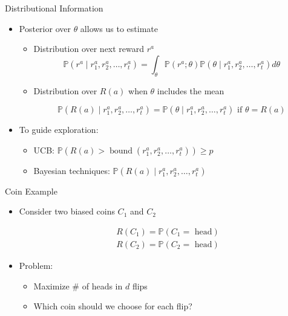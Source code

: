\documentclass[11pt,table]{beamer}
\begin{document}
\begin{frame}{Distributional Information}


    \begin{itemize}
        \item Posterior over $\theta$ allows us to estimate

        \begin{itemize}
            \item  Distribution over next reward $r^{a}$
$$
\mathbb{P}\left(r^{a} \mid r_{1}^{a}, r_{2}^{a}, \ldots, r_{t}^{a}\right)=\int_{\theta} \mathbb{P}\left(r^{a} ; \theta\right) \mathbb{P}\left(\theta \mid r_{1}^{a}, r_{2}^{a}, \ldots, r_{t}^{a}\right) d \theta
$$
\item  Distribution over $R(a)$ when $\theta$ includes the mean

$$
\mathbb{P}\left(R(a) \mid r_{1}^{a}, r_{2}^{a}, \ldots, r_{t}^{a}\right)=\mathbb{P}\left(\theta \mid r_{1}^{a}, r_{2}^{a}, \ldots, r_{t}^{a}\right) \text { if } \theta=R(a)
$$
        \end{itemize}

        \item To guide exploration:

 \begin{itemize}
     \item UCB: \textcolor{red1}{$\mathbb{P}\left(R(a) > \operatorname{bound}\left(r_{1}^{a}, r_{2}^{a}, \ldots, r_{t}^{a}\right)\right) \geq p$}
\item  Bayesian techniques: \textcolor{red1}{$\mathbb{P}\left(R(a) \mid r_{1}^{a}, r_{2}^{a}, \ldots, r_{t}^{a}\right)$}
 \end{itemize}
    \end{itemize}
\end{frame}

\begin{frame}{Coin Example}


    \begin{itemize}
        \item Consider two biased coins $C_{1}$ and $C_{2}$

        $$
\begin{aligned}
& R\left(C_{1}\right)=\mathbb{P}\left(C_{1}=\text { head}\right) \\
& R\left(C_{2}\right)=\mathbb{P}\left(C_{2}=\text { head}\right)
\end{aligned}
$$

\item Problem:
\begin{itemize}
    \item Maximize \# of heads in $d$ flips
\item  Which coin should we choose for each flip? 
\end{itemize}
    \end{itemize}
\end{frame}
\end{document}
